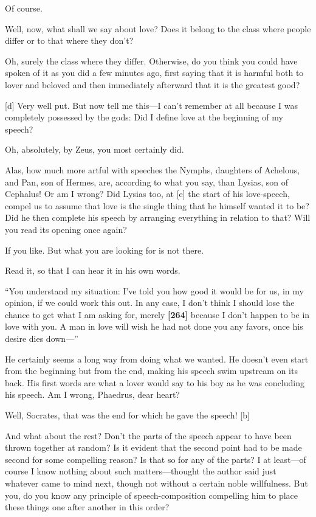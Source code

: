 \sayphaedrus Of course.

\saysocrates Well, now, what shall we say about love? Does it belong to the
class where people differ or to that where they don't?

\sayphaedrus Oh, surely the class where they differ. Otherwise, do you
think you could have spoken of it as you did a few minutes ago, first
saying that it is harmful both to lover and beloved and then immediately
afterward that it is the greatest good?

{[}d{]} \saysocrates Very well put. But now tell me this---I can't remember
at all because I was completely possessed by the gods: Did I define love
at the beginning of my speech?

\sayphaedrus Oh, absolutely, by Zeus, you most certainly did.

\saysocrates Alas, how much more artful with speeches the Nymphs, daughters
of Achelous, and Pan, son of Hermes, are, according to what you say,
than Lysias, son of Cephalus! Or am I wrong? Did Lysias too, at {[}e{]}
the start of his love-speech, compel us to assume that love is the
single thing that he himself wanted it to be? Did he then complete his
speech by arranging everything in relation to that? Will you read its
opening once again?

\sayphaedrus If you like. But what you are looking for is not there.

\saysocrates Read it, so that I can hear it in his own words.

\sayphaedrus “You understand my situation: I've told you how good it would
be for us, in my opinion, if we could work this out. In any case, I
don't think I should lose the chance to get what I am asking for, merely
{\bf {[}264{]}} because I don't happen to be in love with you. A man in
love will wish he had not done you any favors, once his desire dies
down---”

\saysocrates He certainly seems a long way from doing what we wanted. He
doesn't even start from the beginning but from the end, making his
speech swim upstream on its back. His first words are what a lover would
say to his boy as he was concluding his speech. Am I wrong, Phaedrus,
dear heart?

\sayphaedrus Well, Socrates, that was the end for which he gave the speech!
{[}b{]}

\saysocrates And what about the rest? Don't the parts of the speech appear
to have been thrown together at random? Is it evident that the second
point had to be made second for some compelling reason? Is that so for
any of the parts? I at least---of course I know nothing about such
matters---thought the author said just whatever came to mind next,
though not without a certain noble willfulness. But you, do you know any
principle of speech-composition compelling him to place these things one
after another in this order?

